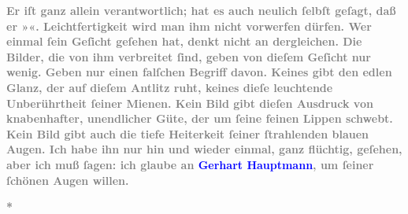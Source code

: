 \pstart
           \noindent{}\textcolor{gray}{\textbf{Er iſt ganz allein verantwortlich; hat es auch neulich ſelbſt
                  geſagt, daß er »\label{K_L03438-5v}\label{K_L03438-5h}«. Leichtfertigkeit wird man ihm nicht
                  vorwerfen dürfen. Wer einmal ſein Geſicht geſehen hat, denkt nicht an dergleichen.
                  Die Bilder, die von ihm verbreitet ſind, geben von dieſem Geſicht nur wenig. Geben
                  nur einen falſchen Begriff davon. Keines gibt den edlen Glanz, der auf dieſem
                  Antlitz ruht, keines dieſe leuchtende Unberührtheit ſeiner Mienen. Kein Bild gibt
                  dieſen Ausdruck von knabenhafter, unendlicher Güte, der um ſeine feinen Lippen
                  schwebt. Kein Bild gibt auch die tiefe Heiterkeit ſeiner ſtrahlenden blauen Augen.
                  Ich habe ihn nur hin und wieder einmal, ganz flüchtig, geſehen, aber ich muß
                  ſagen: ich glaube {\pb}an \textcolor{blue}{Gerhart Hauptmann}{}\ledrightnote{\textcolor{blue}{Gerhart Hauptmann}}, um ſeiner ſchönen Augen
                  willen.}}\pend
           
\pstart
           \centering{}\textcolor{gray}{\textbf{*}}\pend
           
